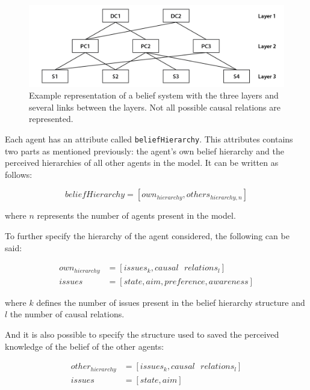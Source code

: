 \begin{figure}
\centering
\includegraphics[scale = 0.75, angle = 0]{figures/Formalisation-04}
\caption{Example representation of a belief system with the three layers and several links between the layers. Not all possible causal relations are represented.}
\label{fig:Formalisation-04}
\end{figure}

Each agent has an attribute called \texttt{beliefHierarchy}. This attributes contains two parts as mentioned previously: the agent’s own belief hierarchy and the perceived hierarchies of all other agents in the model. It can be written as follows:

\begin{equation}
beliefHierarchy = [own_{hierarchy}, others_{hierarchy, n}]
\end{equation}

where $n$ represents the number of agents present in the model.

To further specify the hierarchy of the agent considered, the following can be said:

\begin{equation}\begin{split}
own_{hierarchy} &= [issues_k, causal\text{ }relations_l]\\
issues &= [state, aim, preference, awareness]
\end{split}\end{equation}

where $k$ defines the number of issues present in the belief hierarchy structure and $l$ the number of causal relations.

And it is also possible to specify the structure used to saved the perceived knowledge of the belief of the other agents:

\begin{equation}\begin{split}
other_{hierarchy} &= [issues_k, causal\text{ }relations_l]\\
issues &= [state, aim]
\end{split}\end{equation}

